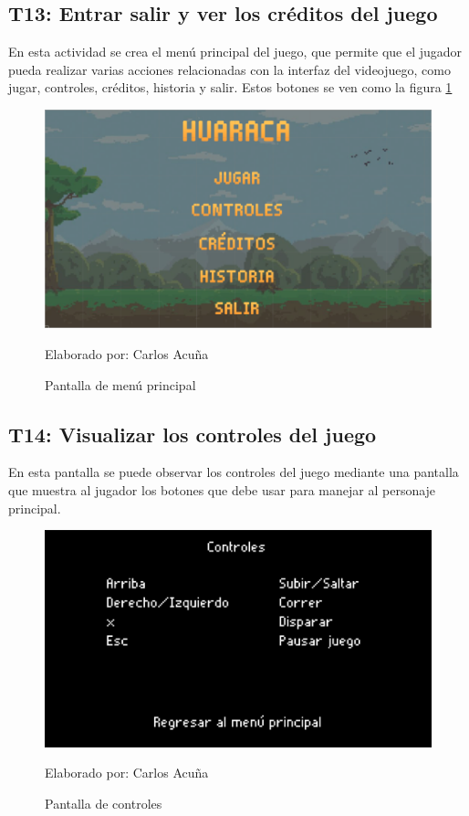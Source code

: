 \documentclass[a4paper, openright, 12pt]{report}
\begin{document}
\subsection*{T13: Entrar salir y ver los créditos del juego}
\justify
En esta actividad se crea el menú principal del juego, que permite que el jugador pueda realizar varias acciones relacionadas con la interfaz del videojuego, como jugar, controles, créditos, historia y salir. Estos botones se ven como la figura   \ref{fig:T13_01}

\begin{figure}[h]
\captionsetup{justification=centering,margin=2cm}
\includegraphics[scale=0.5]{T13_01}
\centering
\caption{Pantalla de menú principal}
Elaborado por: Carlos Acuña
\label{fig:T13_01}
\end{figure}

\subsection*{T14: Visualizar los controles del juego}
\justify
En esta pantalla se puede observar los controles del juego mediante una pantalla que muestra al jugador los botones que debe usar para manejar al personaje principal.

\begin{figure}[h]
\captionsetup{justification=centering,margin=2cm}
\includegraphics[scale=0.5]{T14_01}
\centering
\caption{Pantalla de controles}
Elaborado por: Carlos Acuña
\label{fig:T14_01}
\end{figure}
\end{document}
